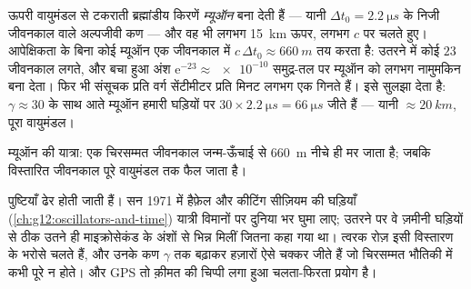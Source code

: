 \begin{example}[म्यूऑन ज़मीन तक पहुँच जाते हैं]\label{ex:g12:special-relativity:muons}
ऊपरी वायुमंडल से टकराती ब्रह्मांडीय किरणें \emph{म्यूऑन} बना देती हैं ---
यानी $\Delta t_0 = \qty{2.2}{\micro s}$ के निजी जीवनकाल वाले अल्पजीवी कण --- और वह भी लगभग \qty{15}{km} ऊपर, लगभग
$c$ पर चलते हुए। आपेक्षिकता के बिना कोई म्यूऑन एक जीवनकाल में $c\,\Delta t_0 \approx \qty{660}{m}$ तय करता
है: उतरने में कोई $23$ जीवनकाल लगते, और बचा हुआ अंश $\mathrm{e}^{-23} \approx \num{e-10}$ समुद्र-तल पर
म्यूऑन को लगभग नामुमकिन बना देता। फिर भी संसूचक प्रति वर्ग सेंटीमीटर प्रति मिनट
लगभग एक गिनते हैं।  इसे सुलझा देता है: $\gamma \approx 30$ के साथ आते
म्यूऑन हमारी घड़ियों पर $30 \times \qty{2.2}{\micro s} = \qty{66}{\micro s}$ जीते हैं --- यानी  $\approx \qty{20}{km}$, पूरा
वायुमंडल।
\end{example}

\begin{omfigure}

{\small म्यूऑन की यात्रा: एक चिरसम्मत जीवनकाल जन्म-ऊँचाई से \qty{660}{m} नीचे ही मर
जाता है; जबकि विस्तारित जीवनकाल पूरे वायुमंडल तक फैल जाता है।}
\end{omfigure}

पुष्टियाँ ढेर होती जाती हैं। सन 1971 में हैफ़ेल और कीटिंग सीज़ियम की 
घड़ियाँ (\cref{ch:g12:oscillators-and-time}) यात्री विमानों पर दुनिया भर घुमा लाए; उतरने पर वे ज़मीनी घड़ियों
से ठीक उतने ही माइक्रोसेकंड के अंशों से भिन्न मिलीं जितना कहा गया था। त्वरक रोज़
इसी विस्तारण के भरोसे चलते हैं, और उनके कण $\gamma$ तक बढ़ाकर हज़ारों ऐसे चक्कर
जीते हैं जो चिरसम्मत भौतिकी में कभी पूरे न होते। और GPS तो क़ीमत की चिप्पी लगा
हुआ चलता-फिरता प्रयोग है।

